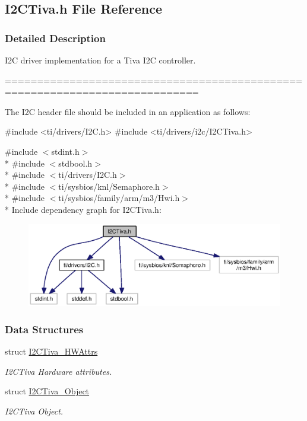 \subsection{I2\+C\+Tiva.\+h File Reference}
\label{_i2_c_tiva_8h}


\subsubsection{Detailed Description}
I2\+C driver implementation for a Tiva I2\+C controller. 

============================================================================

The I2\+C header file should be included in an application as follows\+: 
\begin{DoxyCode}
\textcolor{preprocessor}{#include <ti/drivers/I2C.h>}
\textcolor{preprocessor}{#include <ti/drivers/i2c/I2CTiva.h>}
\end{DoxyCode}
 

{\ttfamily \#include $<$stdint.\+h$>$}\\*
{\ttfamily \#include $<$stdbool.\+h$>$}\\*
{\ttfamily \#include $<$ti/drivers/\+I2\+C.\+h$>$}\\*
{\ttfamily \#include $<$ti/sysbios/knl/\+Semaphore.\+h$>$}\\*
{\ttfamily \#include $<$ti/sysbios/family/arm/m3/\+Hwi.\+h$>$}\\*
Include dependency graph for I2\+C\+Tiva.\+h\+:
\nopagebreak
\begin{figure}[H]
\begin{center}
\leavevmode
\includegraphics[width=350pt]{_i2_c_tiva_8h__incl}
\end{center}
\end{figure}
\subsubsection*{Data Structures}
\begin{DoxyCompactItemize}
\item 
struct \hyperlink{struct_i2_c_tiva___h_w_attrs}{I2\+C\+Tiva\+\_\+\+H\+W\+Attrs}
\begin{DoxyCompactList}\small\item\em I2\+C\+Tiva Hardware attributes. \end{DoxyCompactList}\item 
struct \hyperlink{struct_i2_c_tiva___object}{I2\+C\+Tiva\+\_\+\+Object}
\begin{DoxyCompactList}\small\item\em I2\+C\+Tiva Object. \end{DoxyCompactList}\end{DoxyCompactItemize}
